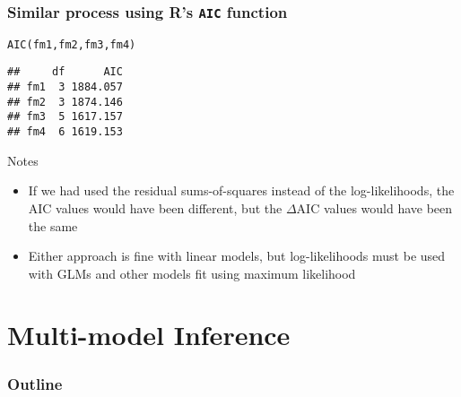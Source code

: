 \documentclass[color=usenames,dvipsnames]{beamer}\usepackage[]{graphicx}\usepackage[]{color}
\makeatletter
\newcommand{\hlstd}[1]{\textcolor[rgb]{0,0,0}{#1}}%
\newcommand{\hlkwd}[1]{\textcolor[rgb]{0.004,0.004,0.506}{#1}}%
\newenvironment{kframe}{%
 \def\at@end@of@kframe{}%
 \ifinner\ifhmode%
  \def\at@end@of@kframe{\end{minipage}}%
  \begin{minipage}{\columnwidth}%
 \fi\fi%
 \def\FrameCommand##1{\hskip\@totalleftmargin \hskip-\fboxsep
 \colorbox{shadecolor}{##1}\hskip-\fboxsep
     \hskip-\linewidth \hskip-\@totalleftmargin \hskip\columnwidth}%
 \MakeFramed {\advance\hsize-\width
   \@totalleftmargin\z@ \linewidth\hsize
   \@setminipage}}%
 {\par\unskip\endMakeFramed%
 \at@end@of@kframe}
\newenvironment{knitrout}{}{} %
\makeatother
\begin{document}
\begin{frame}[fragile]
  \frametitle{Similar process using R's {\tt AIC} function}
\begin{knitrout}
\color{fgcolor}\begin{kframe}
\begin{alltt}
\hlkwd{AIC}\hlstd{(fm1, fm2, fm3, fm4)}
\end{alltt}
\begin{verbatim}
##     df      AIC
## fm1  3 1884.057
## fm2  3 1874.146
## fm3  5 1617.157
## fm4  6 1619.153
\end{verbatim}
\end{kframe}
\end{knitrout}
\pause
\vfill
{Notes}
\begin{itemize}[<+->]
  \item If we had used the residual sums-of-squares instead of the
    log-likelihoods, the AIC values would have been different, but the
    $\Delta$AIC values would have been the same
  \item Either approach is fine with linear models, but log-likelihoods
    must be used with GLMs and other models fit using maximum likelihood
\end{itemize}
\end{frame}





\section{Multi-model Inference}




\begin{frame}[plain]
  \frametitle{Outline}
  \huge
  \tableofcontents[currentsection]
\end{frame}
\end{document}
